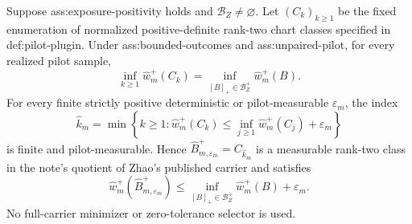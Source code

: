 Suppose ass:exposure-positivity holds and \(\mathcal B_Z\ne\varnothing\).  Let \((C_k)_{k\ge1}\) be the fixed enumeration of normalized positive-definite rank-two chart classes specified in def:pilot-plugin.  Under ass:bounded-outcomes and ass:unpaired-pilot, for every realized pilot sample,
\[
 \inf_{k\ge1}\widehat w_m^+(C_k)
 =\inf_{[B]_+\in\mathcal B_Z^+}\widehat w_m^+(B).
\]
For every finite strictly positive deterministic or pilot-measurable \(\varepsilon_m\), the index
\[
 \widehat k_m=
 \min\left\{k\ge1:
 \widehat w_m^+(C_k)
 \le \inf_{j\ge1}\widehat w_m^+(C_j)+\varepsilon_m
 \right\}
\]
is finite and pilot-measurable.  Hence \(\widehat B_{m,\varepsilon_m}^+=C_{\widehat k_m}\) is a measurable rank-two class in the note's quotient of Zhao's published carrier and satisfies
\[
 \widehat w_m^+(\widehat B_{m,\varepsilon_m}^+)
 \le
 \inf_{[B]_+\in\mathcal B_Z^+}\widehat w_m^+(B)+\varepsilon_m.
\]
No full-carrier minimizer or zero-tolerance selector is used.